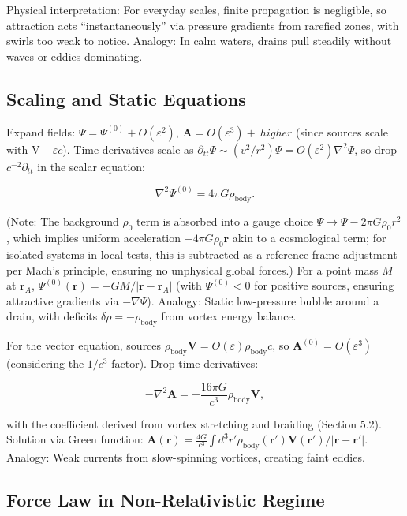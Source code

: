 \documentclass{article}
\begin{document}
Physical interpretation: For everyday scales, finite propagation is negligible, so attraction acts ``instantaneously'' via pressure gradients from rarefied zones, with swirls too weak to notice. Analogy: In calm waters, drains pull steadily without waves or eddies dominating.

\subsection{Scaling and Static Equations}

Expand fields: $\Psi = \Psi^{(0)} + O(\varepsilon^2)$, $\mathbf{A} = O(\varepsilon^3) + \ higher$ (since sources scale with V ~ $\varepsilon c$). Time-derivatives scale as $\partial_{tt} \Psi \sim (v^2 / r^2) \Psi = O(\varepsilon^2) \nabla^2 \Psi$, so drop $c^{-2} \partial_{tt}$ in the scalar equation:

\[
\nabla^2 \Psi^{(0)} = 4\pi G \rho_{\text{body}}.
\]

(Note: The background $\rho_0$ term is absorbed into a gauge choice $\Psi \to \Psi - 2\pi G \rho_0 r^2$, which implies uniform acceleration $-4\pi G \rho_0 \mathbf{r}$ akin to a cosmological term; for isolated systems in local tests, this is subtracted as a reference frame adjustment per Mach's principle, ensuring no unphysical global forces.) For a point mass $M$ at $\mathbf{r}_A$, $\Psi^{(0)}(\mathbf{r}) = -GM / |\mathbf{r} - \mathbf{r}_A|$ (with $\Psi^{(0)} < 0$ for positive sources, ensuring attractive gradients via $-\nabla \Psi$). Analogy: Static low-pressure bubble around a drain, with deficits $\delta \rho = -\rho_{\text{body}}$ from vortex energy balance.

For the vector equation, sources $\rho_{\text{body}} \mathbf{V} = O(\varepsilon) \rho_{\text{body}} c$, so $\mathbf{A}^{(0)} = O(\varepsilon^3)$ (considering the $1/c^3$ factor). Drop time-derivatives:

\[
- \nabla^2 \mathbf{A} = -\frac{16\pi G}{c^3} \rho_{\text{body}} \mathbf{V},
\]

with the coefficient derived from vortex stretching and braiding (Section 5.2). Solution via Green function: $\mathbf{A}(\mathbf{r}) = \frac{4 G}{c^3} \int d^3 r' \rho_{\text{body}}(\mathbf{r}') \mathbf{V}(\mathbf{r}') / |\mathbf{r} - \mathbf{r}'|$. Analogy: Weak currents from slow-spinning vortices, creating faint eddies.

\subsection{Force Law in Non-Relativistic Regime}
\end{document}
